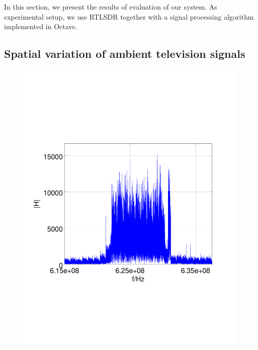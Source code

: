 
In this section, we present the results of evaluation of our system. As experimental 
setup, we use RTLSDR together with a signal processing algorithm implemented
in Octave. 

\subsection{Spatial variation of ambient television signals}

\begin{figure}[h]
	\centering
	\begin{minipage}{0.49\columnwidth}
	\includegraphics[width=\columnwidth]{./fig/626mhz_raw}
	\end{minipage}
	\hfill
	\begin{minipage}{0.49\columnwidth}

\end{minipage}
\end{figure}
